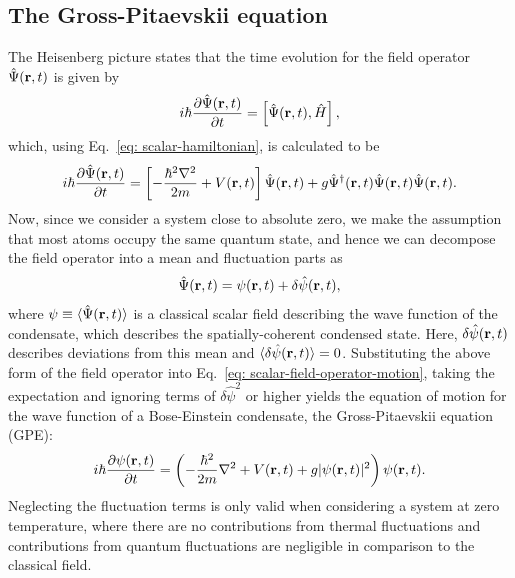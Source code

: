 \subsection{The Gross-Pitaevskii equation}
The Heisenberg picture states that the time evolution for the field operator
\(\hat{\Psi}(\vb{r}, t)\) is given by~\cite{Pitaevskii2003}
\begin{align}
    i\hbar\pdv{\hat{\Psi}(\vb{r}, t)}{t} = \left[\hat{\Psi}(\vb{r}, t), \hat{H}
    \right],
\end{align}
which, using Eq.~\eqref{eq: scalar-hamiltonian}, is calculated to be
\begin{align}\label{eq: scalar-field-operator-motion}
    i\hbar\pdv{\hat{\Psi}(\vb{r}, t)}{t} = \left[-\frac{\hbar^2\nabla^2}{2m}
    + V(\vb{r}, t)\right]\hat{\Psi}(\vb{r}, t)
    + g\hat{\Psi}^\dagger(\vb{r}, t)\hat{\Psi}(\vb{r}, t)\hat{\Psi}(\vb{r}, t).
\end{align}
Now, since we consider a system close to absolute zero, we make the assumption
that most atoms occupy the same quantum state, and hence we can decompose the
field operator into a mean and fluctuation parts as~\cite{Pitaevskii2003}
\begin{align}
    \hat{\Psi}(\vb{r}, t) = \psi(\vb{r}, t) + \delta\hat{\psi}(\vb{r}, t),
\end{align}
where \(\psi \equiv \langle \hat{\Psi}(\vb{r}, t)\rangle\) is a classical scalar
field describing the wave function of the condensate, which describes the
spatially-coherent condensed state.
Here, \(\delta\hat{\psi}(\vb{r}, t)\) describes deviations from this mean and
\(\langle \delta\hat{\psi}(\vb{r}, t)\rangle = 0\).
Substituting the above form of the field operator into
Eq.~\eqref{eq: scalar-field-operator-motion}, taking the expectation and
ignoring terms of \(\delta\hat{\psi}^2\) or higher yields the equation of motion
for the wave function of a Bose-Einstein condensate, the Gross-Pitaevskii
equation (GPE):
\begin{equation}\label{eq: scalar-GPE}
    i\hbar \pdv{\psi(\vb{r}, t)}{t} = \left(-\frac{\hbar^2}{2m}\nabla^2
    + V(\vb{r}, t) +g|\psi(\vb{r}, t)|^2\right)\psi(\vb{r}, t).
\end{equation}
Neglecting the fluctuation terms is only valid when considering a system at zero
temperature, where there are no contributions from thermal fluctuations and
contributions from quantum fluctuations are negligible in comparison to the
classical field.

